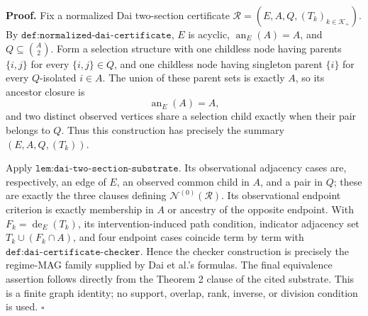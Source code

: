 \textbf{Proof.}
Fix a normalized Dai two-section certificate \(\mathcal R=(E,A,Q,(T_k)_{k\in\mathcal K_+})\).  By \(\texttt{def:normalized-dai-certificate}\), \(E\) is acyclic, \(\operatorname{an}_E(A)=A\), and \(Q\subseteq\binom A2\).  Form a selection structure with one childless node having parents \(\{i,j\}\) for every \(\{i,j\}\in Q\), and one childless node having singleton parent \(\{i\}\) for every \(Q\)-isolated \(i\in A\).  The union of these parent sets is exactly \(A\), so its ancestor closure is
\[
\operatorname{an}_E(A)=A,
\]
and two distinct observed vertices share a selection child exactly when their pair belongs to \(Q\).  Thus this construction has precisely the summary \((E,A,Q,(T_k))\).

Apply \(\texttt{lem:dai-two-section-substrate}\).  Its observational adjacency cases are, respectively, an edge of \(E\), an observed common child in \(A\), and a pair in \(Q\); these are exactly the three clauses defining \(\mathcal N^{(0)}(\mathcal R)\).  Its observational endpoint criterion is exactly membership in \(A\) or ancestry of the opposite endpoint.  With \(F_k=\operatorname{de}_E(T_k)\), its intervention-induced path condition, indicator adjacency set \(T_k\cup(F_k\cap A)\), and four endpoint cases coincide term by term with \(\texttt{def:dai-certificate-checker}\).  Hence the checker construction is precisely the regime-MAG family supplied by Dai et al.'s formulas.  The final equivalence assertion follows directly from the Theorem 2 clause of the cited substrate.  This is a finite graph identity; no support, overlap, rank, inverse, or division condition is used. \(\square\)